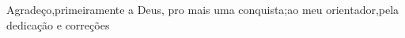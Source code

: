 %
%

\begin{agradecimento}
    \noindent Agradeço,primeiramente a Deus, pro mais uma conquista;ao meu orientador,pela dedicação e correções

    \noindent \textbf{}
\end{agradecimento}


